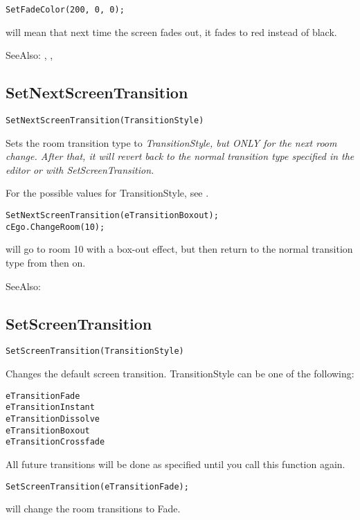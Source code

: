 \begin{verbatim}
SetFadeColor(200, 0, 0);
\end{verbatim}
will mean that next time the screen fades out, it fades to red instead of black.

SeeAlso: , ,


\subsection{SetNextScreenTransition}\label{SetNextScreenTransition}%

\begin{verbatim}
SetNextScreenTransition(TransitionStyle)
\end{verbatim}

Sets the room transition type to \it{TransitionStyle}, but ONLY for the next room change. After
that, it will revert back to the normal transition type specified in the editor or with
SetScreenTransition.

For the possible values for TransitionStyle, see .

\begin{verbatim}
SetNextScreenTransition(eTransitionBoxout);
cEgo.ChangeRoom(10);
\end{verbatim}
will go to room 10 with a box-out effect, but then return to the normal transition
type from then on.

SeeAlso: 


\subsection{SetScreenTransition}\label{SetScreenTransition}%

\begin{verbatim}
SetScreenTransition(TransitionStyle)
\end{verbatim}
Changes the default screen transition. TransitionStyle can be one of the following:
\begin{verbatim}
eTransitionFade
eTransitionInstant
eTransitionDissolve
eTransitionBoxout
eTransitionCrossfade
\end{verbatim}
All future transitions will be done as specified until you call this
function again.

\begin{verbatim}
SetScreenTransition(eTransitionFade);
\end{verbatim}
will change the room transitions to Fade.

